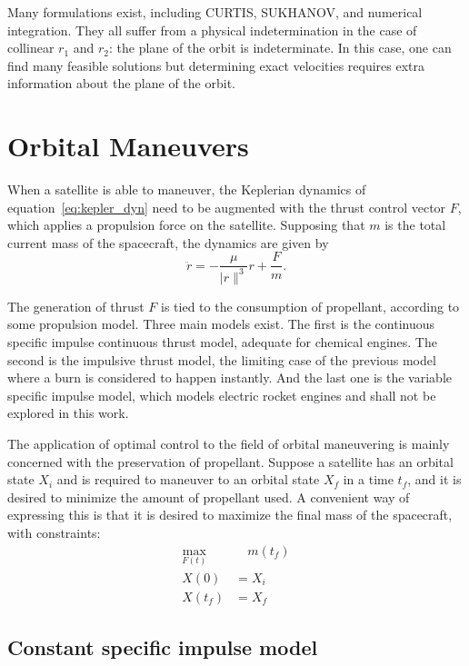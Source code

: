 Many formulations exist, including CURTIS, SUKHANOV, and numerical integration. They all suffer from a physical indetermination in the case of collinear \(r_1\) and \(r_2\): the plane of the orbit is indeterminate. In this case, one can find many feasible solutions but determining exact velocities requires extra information about the plane of the orbit.\


\section{Orbital Maneuvers}

When a satellite is able to maneuver, the Keplerian dynamics of equation~\eqref{eq:kepler_dyn} need to be augmented with the thrust control vector \(F\), which applies a propulsion force on the satellite. Supposing that \(m\) is the total current mass of the spacecraft, the dynamics are given by
\begin{equation}
    \ddot r = -\frac{\mu}{\lvert r \rVert^3}r + \frac{F}{m}.
\end{equation}

The generation of thrust \(F\) is tied to the consumption of propellant, according to some propulsion model. Three main models exist. The first is the continuous specific impulse continuous thrust model, adequate for chemical engines. The second is the impulsive thrust model, the limiting case of the previous model where a burn is considered to happen instantly. And the last one is the variable specific impulse model, which models electric rocket engines and shall not be explored in this work.

The application of optimal control to the field of orbital maneuvering is mainly concerned with the preservation of propellant. Suppose a satellite has an orbital state \(X_i\) and is required to maneuver to an orbital state \(X_f\) in a time \(t_f\), and it is desired to minimize the amount of propellant used. A convenient way of expressing this is that it is desired to maximize the final mass of the spacecraft, with constraints:
\begin{align}
    \max_{F(t)}&\quad m(t_f) \label{eq:max_final_mass} \\
    X(0) &= X_i \\
    X(t_f) &= X_f
\end{align}

\subsection{Constant specific impulse model}

